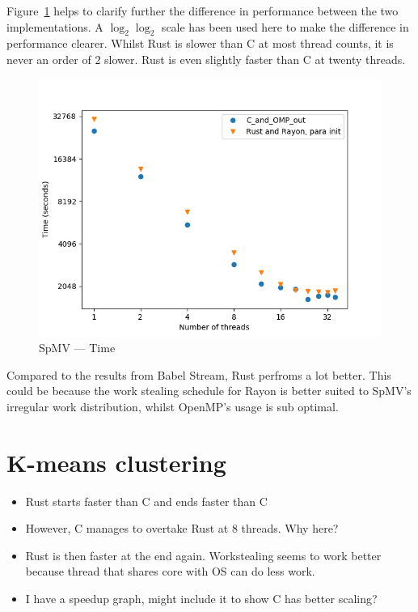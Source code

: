 Figure~\ref{fig:sparse-time} helps to clarify further the difference in performance between  the two implementations. A $\log_2 \log_2$ scale has been used here to make the difference in performance clearer. Whilst Rust is slower than C at most thread counts, it is never an order of 2 slower.
Rust is even slightly faster than C at twenty threads. 
\begin{figure}[h]
\centering
\includegraphics[width=.9\linewidth]{figs/sparse/time.png}
\caption{SpMV --- Time}\label{fig:sparse-time}
\end{figure}

Compared to the results from Babel Stream, Rust perfroms a lot better. This could be because the work stealing schedule for Rayon is better suited to SpMV's irregular work distribution, whilst OpenMP's usage is sub optimal.


\section{K-means clustering}

\begin{itemize}
    \item Rust starts faster than C and ends faster than C
    \item However, C manages to overtake Rust at 8 threads. Why here?
    \item Rust is then faster at the end again. Workstealing seems to work better because thread that shares core with OS can do less work.
    \item I have a speedup graph, might include it to show C has better scaling?
\end{itemize}

